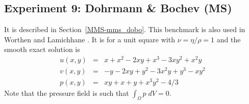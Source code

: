 \newpage
\subsection*{Experiment 9: Dohrmann \& Bochev (MS)}

It is described in Section~\ref{MMS-mms_dobo}. 
This benchmark is also used in Worthen \etal \cite{wosp14} and Lamichhane \etal \cite{lami17}.
It is for a unit square with $\nu=\eta/\rho=1$ and the smooth exact solution is
\begin{eqnarray}
u(x,y) &=& x+x^2 - 2xy+x^3 - 3xy^2 + x^2y \\
v(x,y) &=& -y-2xy+y^2 -3x^2y + y^3 - xy^2 \\
p(x,y) &=& xy+x+y+x^3y^2 - 4/3
\end{eqnarray}
Note that the pressure field is such that $\int_{\Omega} p \; dV = 0$.


